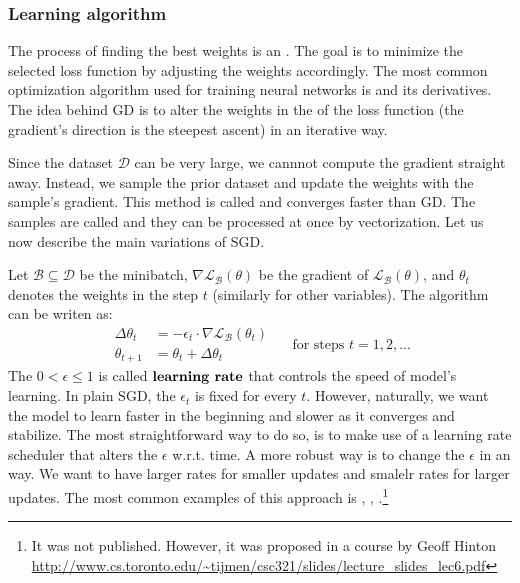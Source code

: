    \subsubsection{Learning algorithm}
    The process of finding the best weights is an . The
    goal is to minimize the selected loss function by adjusting the weights
    accordingly. The most common optimization algorithm used for training neural
    networks is  and its derivatives. The idea behind GD
    is to alter the weights in the  of the
    loss function (the gradient's direction is the steepest ascent) in an iterative
    way.

    Since the dataset $\mathcal{D}$ can be very large, we cannnot compute the
    gradient straight away. Instead, we sample the prior dataset and update the
    weights with the sample's gradient. This method is called  and converges faster than GD. The samples are called
     and they can be processed at once by vectorization. Let us now
    describe the main variations of SGD.

     Let $\mathcal{B} \subseteq \mathcal{D}$ be
    the minibatch, $\nabla\mathcal{L_\mathcal{B}(\theta)}$ be the gradient of
$\mathcal{L}_\mathcal{B}(\theta)$, and $\theta_t$ denotes the weights in the
    step $t$ (similarly for other variables). The algorithm can be writen as:
    $$
        \begin{array}{rl}
            \Delta\theta_{t} & = - \epsilon_{t} \cdot \nabla{\mathcal{L}_\mathcal{B}(\theta_{t})} \\
            \theta_{t+1}     & = \theta_{t} + \Delta\theta_{t}
        \end{array}
        \quad \text{ for steps } t = 1,2,...
    $$
    The $0 < \epsilon \leq 1$ is called $\textbf{learning rate}$ that controls the
    speed of model's learning. In plain SGD, the $\epsilon_t$ is fixed for every
$t$. However, naturally, we want the model to learn faster in the beginning and
    slower as it converges and stabilize. The most straightforward way to do so, is
    to make use of a learning rate scheduler that alters the $\epsilon$ w.r.t. time.
    A more robust way is to change the $\epsilon$ in an  way. We want
    to have larger rates for smaller updates and smalelr rates for larger updates.
    The most common examples of this approach is  \cite{adagrad},
     \cite{adadelta}, .\footnote{It was not published.
        However, it was proposed in a course by Geoff Hinton \url{
            http://www.cs.toronto.edu/~tijmen/csc321/slides/lecture_slides_lec6.pdf}
    }

